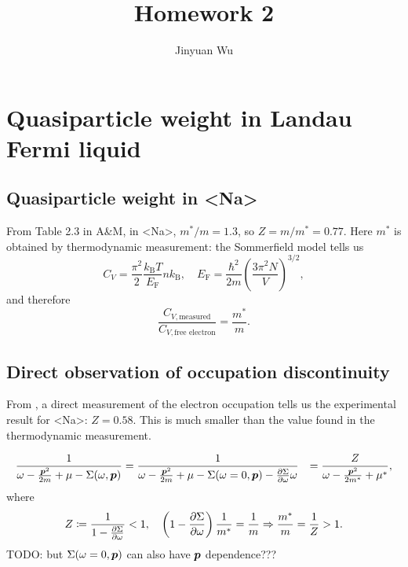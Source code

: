 \documentclass[hyperref, a4paper]{article}
\title{Homework 2}
\author{Jinyuan Wu}
\def\\{}%
\def\ce#1{<#1>}%
\newcommand*{\efermi}{E_{\text{F}}}
\newcommand*{\kB}{k_{\text{B}}}
\begin{document}
\maketitle

\section{Quasiparticle weight in Landau Fermi liquid}

\subsection{Quasiparticle weight in \ce{Na}}

From Table 2.3 in A\&M, in \ce{Na}, 
$m^* / m = 1.3$, 
so $Z = m / m^* = 0.77$.
Here $m^*$ is obtained by thermodynamic measurement:
the Sommerfield model tells us 
\begin{equation}
    C_V = \frac{\pi^2}{2} \frac{\kB T}{\efermi} n \kB, \quad 
    \efermi = \frac{\hbar^2}{2m} \left(\frac{3 \pi^2 N}{V}\right)^{3/2},
\end{equation}
and therefore 
\begin{equation}
    \frac{C_{V, \text{measured}}}{C_{V, \text{free electron}}} = \frac{m^*}{m}.
\end{equation}

\subsection{Direct observation of occupation discontinuity}

From \cite{huotari2010momentum}, 
a direct measurement of the electron occupation 
tells us the experimental result for \ce{Na}: $Z = 0.58$.
This is much smaller than the value found in the thermodynamic measurement.

\begin{equation}
    \begin{aligned}
        \frac{1}{\omega - \frac{\vb*{p}^2}{2m} + \mu - \Sigma(\omega, \vb*{p})}
        &= \frac{1}{\omega - \frac{\vb*{p}^2}{2m} + \mu - \Sigma(\omega = 0, \vb*{p}) - \pdv{\Sigma}{\omega} \omega} \\ 
        &= \frac{Z}{\omega - \frac{\vb*{p}^2}{2 m^*} + \mu^*},
    \end{aligned}
\end{equation}
where 
\begin{equation}
    Z \coloneqq \frac{1}{1 - \pdv{\Sigma}{\omega}} < 1, \quad 
    \left(1 - \pdv{\Sigma}{\omega} \right) \frac{1}{m^*} = \frac{1}{m} 
    \Rightarrow \frac{m^*}{m} = \frac{1}{Z} > 1.
\end{equation}
TODO: but $\Sigma(\omega = 0, \vb*{p})$ can also have $\vb*{p}$ dependence??? 
\end{document}
